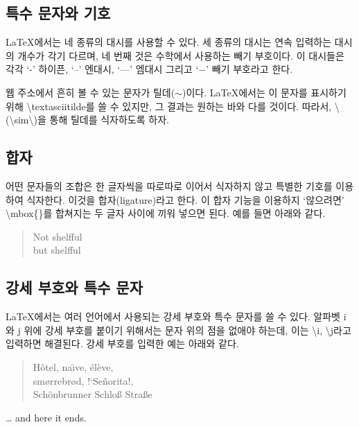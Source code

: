 \documentclass[a4paper, 11pt]{article}
\begin{document}
\subsection{특수 문자와 기호}
\LaTeX{}에서는 네 종류의 대시를 사용할 수 있다. 세 종류의 대시는 연속 입력하는 대시의 개수가 각기 다르며, 네 번째 것은 수학에서 사용하는 빼기 부호이다. 
이 대시들은 각각 `-' 하이픈, `--' 엔대시, `---' 엠대시 그리고 `$-$' 빼기 부호라고 한다. 

웹 주소에서 흔히 볼 수 있는 문자가 틸데(\(\sim\){})이다. \LaTeX{}에서는 이 문자를 표시하기 위해 \textbackslash{}textasciitilde를 쓸 수 있지만, 그 결과는 원하는 바와 다를 것이다. 
따라서, \textbackslash(\textbackslash{}sim\textbackslash)을 통해 틸데를 식자하도록 하자.  
\newline \\

\subsection{합자}
어떤 문자들의 조합은 한 글자씩을 따로따로 이어서 식자하지 않고 특별한 기호를 이용하여 식자한다. 이것을 합자(ligature)라고 한다. 
이 합자 기능을 이용하지 `않으려면' \textbackslash{}mbox\{\}를 합쳐지는 두 글자 사이에 끼워 넣으면 된다. 
예를 들면 아래와 같다. 
\begin{quotation}
Not shelfful \\
but shelf\mbox{}ful
\end{quotation}

\subsection{강세 부호와 특수 문자}
\LaTeX{}에서는 여러 언어에서 사용되는 강세 부호와 특수 문자를 쓸 수 있다. 
알파벳 i와 j 위에 강세 부호를 붙이기 위해서는 문자 위의 점을 없애야 하는데, 이는 \textbackslash{}i, \textbackslash{}j라고 입력하면 해결된다. 
강세 부호를 입력한 예는 아래와 같다. 
\begin{quotation}
H\^otel, na\"\i ve, \'el\`eve, \\
sm\o rrebr\o d, !`Se\~norita!, \\
Sch\"onbrunner Schlo\ss{}
Stra\ss e 
\end{quotation}

\ldots{} and here it ends. 
\end{document}
